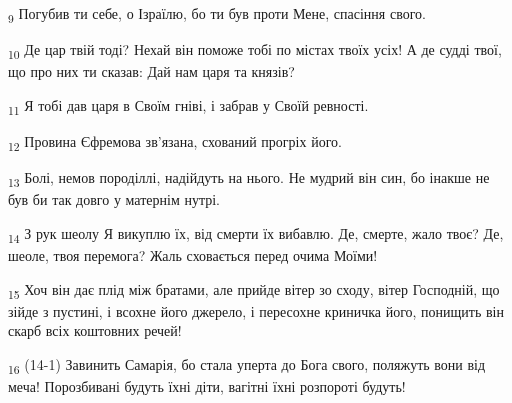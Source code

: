 \begin{tcolorbox}
\textsubscript{9} Погубив ти себе, о Ізраїлю, бо ти був проти Мене, спасіння свого.
\end{tcolorbox}
\begin{tcolorbox}
\textsubscript{10} Де цар твій тоді? Нехай він поможе тобі по містах твоїх усіх! А де судді твої, що про них ти сказав: Дай нам царя та князів?
\end{tcolorbox}
\begin{tcolorbox}
\textsubscript{11} Я тобі дав царя в Своїм гніві, і забрав у Своїй ревності.
\end{tcolorbox}
\begin{tcolorbox}
\textsubscript{12} Провина Єфремова зв'язана, схований прогріх його.
\end{tcolorbox}
\begin{tcolorbox}
\textsubscript{13} Болі, немов породіллі, надійдуть на нього. Не мудрий він син, бо інакше не був би так довго у матернім нутрі.
\end{tcolorbox}
\begin{tcolorbox}
\textsubscript{14} З рук шеолу Я викуплю їх, від смерти їх вибавлю. Де, смерте, жало твоє? Де, шеоле, твоя перемога? Жаль сховається перед очима Моїми!
\end{tcolorbox}
\begin{tcolorbox}
\textsubscript{15} Хоч він дає плід між братами, але прийде вітер зо сходу, вітер Господній, що зійде з пустині, і всохне його джерело, і пересохне криничка його, понищить він скарб всіх коштовних речей!
\end{tcolorbox}
\begin{tcolorbox}
\textsubscript{16} (14-1) Завинить Самарія, бо стала уперта до Бога свого, поляжуть вони від меча! Порозбивані будуть їхні діти, вагітні їхні розпороті будуть!
\end{tcolorbox}
